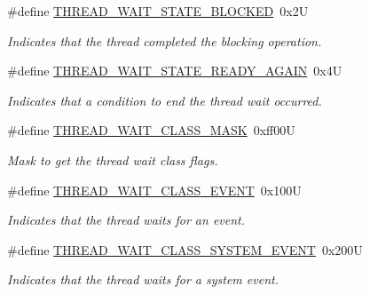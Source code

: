\begin{DoxyCompactItemize}
\#define \mbox{\hyperlink{group__RTEMSScoreThread_gaa9487eb8db998d29cb1f712155769583}{T\+H\+R\+E\+A\+D\+\_\+\+W\+A\+I\+T\+\_\+\+S\+T\+A\+T\+E\+\_\+\+B\+L\+O\+C\+K\+ED}}~0x2U
\begin{DoxyCompactList}\small\item\em Indicates that the thread completed the blocking operation. \end{DoxyCompactList}\item 
\#define \mbox{\hyperlink{group__RTEMSScoreThread_gac00cb9ccdda63a4731f4d80a89371ea0}{T\+H\+R\+E\+A\+D\+\_\+\+W\+A\+I\+T\+\_\+\+S\+T\+A\+T\+E\+\_\+\+R\+E\+A\+D\+Y\+\_\+\+A\+G\+A\+IN}}~0x4U
\begin{DoxyCompactList}\small\item\em Indicates that a condition to end the thread wait occurred. \end{DoxyCompactList}\item 
\mbox{\label{group__RTEMSScoreThread_gab8f763ac3474c8e2e5a493de0f9fd676}} 
\#define \mbox{\hyperlink{group__RTEMSScoreThread_gab8f763ac3474c8e2e5a493de0f9fd676}{T\+H\+R\+E\+A\+D\+\_\+\+W\+A\+I\+T\+\_\+\+C\+L\+A\+S\+S\+\_\+\+M\+A\+SK}}~0xff00U
\begin{DoxyCompactList}\small\item\em Mask to get the thread wait class flags. \end{DoxyCompactList}\item 
\mbox{\label{group__RTEMSScoreThread_gaefe28b0cc1c352513a17974207cf9f4b}} 
\#define \mbox{\hyperlink{group__RTEMSScoreThread_gaefe28b0cc1c352513a17974207cf9f4b}{T\+H\+R\+E\+A\+D\+\_\+\+W\+A\+I\+T\+\_\+\+C\+L\+A\+S\+S\+\_\+\+E\+V\+E\+NT}}~0x100U
\begin{DoxyCompactList}\small\item\em Indicates that the thread waits for an event. \end{DoxyCompactList}\item 
\mbox{\label{group__RTEMSScoreThread_gad87c9c823f1022eb0843801438b91f29}} 
\#define \mbox{\hyperlink{group__RTEMSScoreThread_gad87c9c823f1022eb0843801438b91f29}{T\+H\+R\+E\+A\+D\+\_\+\+W\+A\+I\+T\+\_\+\+C\+L\+A\+S\+S\+\_\+\+S\+Y\+S\+T\+E\+M\+\_\+\+E\+V\+E\+NT}}~0x200U
\begin{DoxyCompactList}\small\item\em Indicates that the thread waits for a system event. \end{DoxyCompactList}\item 

\end{DoxyCompactItemize}
